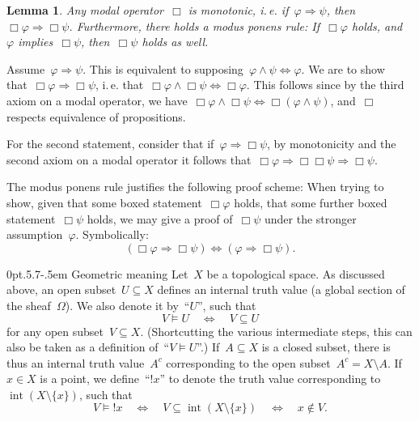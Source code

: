 \documentclass[10pt,reqno,a4paper]{amsbook}
\makeatletter
\theoremstyle{definition}
\theoremstyle{plain}
\newtheorem{lemma}[defn]{Lemma}
\theoremstyle{remark}
\DeclareMathOperator{\Int}{int}
\newcommand{\?}{\,{:}\,}
\renewcommand{\_}{\mathpunct{.}\,}
\newcommand{\notat}[1]{{!#1}}
\newcommand{\ie}{i.\,e.\@\xspace}
\renewenvironment{proof}[1][\proofname]{\par
  \pushQED{\qed}%
  \normalfont \topsep6\p@\@plus6\p@\relax
  \trivlist
  \item[\hskip\labelsep
        \itshape
    #1\@addpunct{.}]\ignorespaces
}{%
  \popQED\endtrivlist\@endpefalse
}
\def\subsection{\@startsection{subsection}{2}%
  {0pt}{.5\linespacing\@plus.7\linespacing}{-.5em}%
  {\normalfont\bfseries}}
\makeatother
\begin{document}
\begin{lemma}Any modal operator~$\Box$ is monotonic, \ie if~$\varphi
\Rightarrow \psi$, then~$\Box\varphi \Rightarrow \Box\psi$. Furthermore, there
holds a modus ponens rule: If~$\Box\varphi$ holds, and~$\varphi$
implies~$\Box\psi$, then~$\Box\psi$ holds as well.\end{lemma}
\begin{proof}Assume~$\varphi \Rightarrow \psi$. This is equivalent to
supposing~$\varphi \wedge \psi \Leftrightarrow \varphi$. We are to show
that~$\Box\varphi \Rightarrow \Box\psi$, \ie that~$\Box\varphi \wedge
\Box\psi \Leftrightarrow \Box\varphi$. This follows since by the third
axiom on a modal operator, we have~$\Box\varphi \wedge \Box\psi \Leftrightarrow
\Box(\varphi \wedge \psi)$, and~$\Box$ respects equivalence of propositions.

For the second statement, consider that if~$\varphi \Rightarrow \Box\psi$, by
monotonicity and the second axiom on a modal operator it follows
that~$\Box\varphi \Rightarrow \Box\Box\psi \Rightarrow \Box\psi$.
\end{proof}

\label{proof-scheme-boxed-statements}The modus ponens rule justifies the
following proof scheme: When trying to show, given that some boxed
statement~$\Box\varphi$ holds, that some further boxed statement~$\Box\psi$
holds, we may give a proof of~$\Box\psi$ under the stronger
assumption~$\varphi$. Symbolically:
\[ (\Box\varphi \Rightarrow \Box\psi) \Longleftrightarrow
  (\varphi \Rightarrow \Box\psi). \]


\subsection{Geometric meaning}\label{sect:modalities-geometric-meaning}
Let~$X$ be a topological space. As discussed
above, an open subset~$U \subseteq X$ defines an internal truth value (a global
section of the sheaf~$\Omega$). We also denote it by~``$U$'', such that
\[ V \models U \quad\Longleftrightarrow\quad V \subseteq U \]
for any open subset~$V \subseteq X$. (Shortcutting the various intermediate
steps, this can also be taken as a definition of~``$V \models U$''.)
If~$A \subseteq X$ is a closed subset, there is thus an internal truth
value~$A^c$ corresponding to the open subset~$A^c = X \setminus A$. If~$x \in
X$ is a point, we define~``$\notat{x}$'' to denote the truth value
corresponding to~$\Int(X \setminus \{x\})$, such that
\[ V \models \notat{x} \quad\Longleftrightarrow\quad V \subseteq \Int(X
\setminus \{ x \}) \quad\Longleftrightarrow\quad x \not\in V. \]
\end{document}
